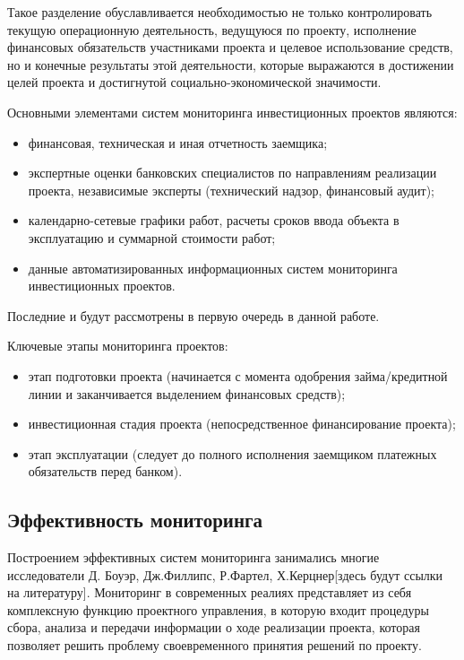 \documentclass[12pt,a4paper]{article} %
\begin{document}
Такое разделение обуславливается необходимостью не только контролировать текущую операционную деятельность, ведущуюся по проекту, исполнение финансовых обязательств участниками проекта и целевое использование средств, но и конечные результаты этой деятельности, которые выражаются в достижении целей проекта и достигнутой социально-экономической значимости.

Основными элементами систем мониторинга инвестиционных проектов являются:
\begin{itemize}
	\item финансовая, техническая и иная отчетность заемщика;
	\item экспертные оценки банковских специалистов по направлениям реализации проекта, независимые эксперты (технический надзор, финансовый аудит);
	\item календарно-сетевые графики работ, расчеты сроков ввода объекта в эксплуатацию и суммарной стоимости работ;
	\item данные автоматизированных информационных систем мониторинга инвестиционных проектов.
\end{itemize}

Последние и будут рассмотрены в первую очередь в данной работе.

Ключевые этапы мониторинга проектов:
\begin{itemize}
	\item этап подготовки проекта (начинается с момента одобрения займа/кредитной линии и заканчивается выделением финансовых средств);
	\item инвестиционная стадия проекта (непосредственное финансирование проекта);
	\item этап эксплуатации (следует до полного исполнения заемщиком платежных обязательств перед банком).
\end{itemize}

\subsection{Эффективность мониторинга}

Построением эффективных систем мониторинга занимались многие исследователи Д. Боуэр, Дж.Филлипс, Р.Фартел, Х.Керцнер[здесь будут ссылки на литературу]. Мониторинг в современных реалиях представляет из себя комплексную функцию проектного управления, в которую входит процедуры сбора, анализа и передачи информации о ходе реализации проекта, которая позволяет решить проблему своевременного принятия решений по проекту.
\end{document}
